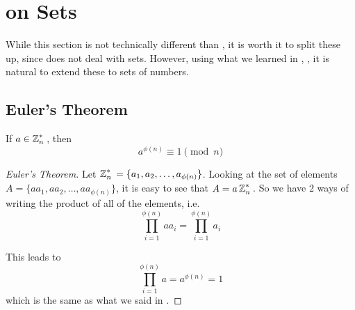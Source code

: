 \section{ on Sets}\label{sec:Number_Theory_on_Sets}
While this section is not technically different than , it is worth it to split these up, since  does not deal with sets.
However, using what we learned in , , it is natural to extend these to sets of numbers.









\subsection{Euler's Theorem}\label{subsec:Eulers_Theorem}
\begin{theorem}\label{thm:Eulers_Theorem}
  If $a \in \operatorname{\mathbb{Z}}_{n}^{*}{}$, then
  \begin{equation}\label{eq:Eulers_Theorem}
    a^{\phi(n)} \equiv 1 \pmod{n}
  \end{equation}
\end{theorem}

\begin{proof}[Euler's Theorem]\label{proof:Eulers_Theorem}
  Let $\operatorname{\mathbb{Z}}_{n}^{*}{} = \lbrace a_{1}, a_{2}, \ldots, a_{\phi(n)} \rbrace$.
  Looking at the set of elements $A = \lbrace aa_{1}, aa_{2}, \ldots, aa_{\phi(n)} \rbrace$, it is easy to see that $A = a \operatorname{\mathbb{Z}}_{n}^{*}{}$.
  So we have 2 ways of writing the product of all of the elements, i.e.
  \begin{equation*}
    \prod\limits_{i=1}^{\phi(n)} a a_{i} = \prod\limits_{i=1}^{\phi(n)} a_{i}
  \end{equation*}
  
  This leads to
  \begin{equation*}
    \prod\limits_{i=1}^{\phi(n)} a = a^{\phi(n)} = 1
  \end{equation*}
  which is the same as what we said in .
\end{proof}

